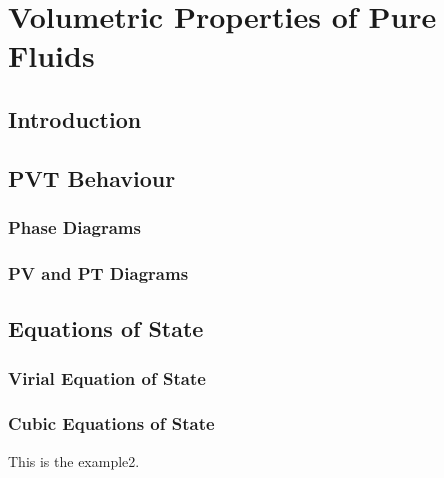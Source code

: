 
\chapter{Volumetric Properties of Pure Fluids}\label{chp2}
%


\section{Introduction}\label{chap2:Introduction}



\section{PVT Behaviour}\label{chp2:PVTBehaviour}


\subsection{Phase Diagrams}\label{chp2:PhaseDiagram}

\subsection{PV and PT Diagrams}\label{chp2:PVPTDiagram}

\section{Equations of State}\label{chp2:EOS}


\subsection{Virial Equation of State}\label{chp2:VirialEOS}

\subsection{Cubic Equations of State}\label{chp2:CubicEOS}
\begin{exmp}
This is the example2.
\end{exmp}

%
